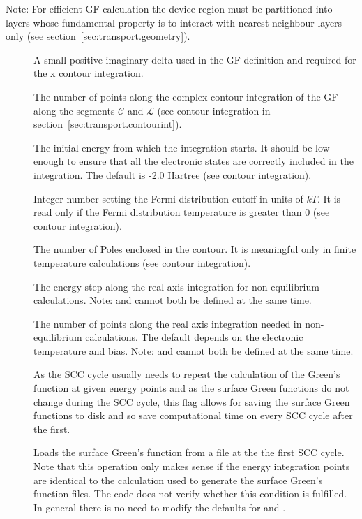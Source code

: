 Note: For efficient GF calculation the device region must be partitioned into
layers whose fundamental property is to interact with nearest-neighbour layers
only (see section~\ref{sec:transport.geometry}).

\begin{description}
\item[] A small positive imaginary delta used
  in the GF definition and required for the x contour integration.
\item[] The number of points along the complex contour
  integration of the GF along the segments $\mathcal{C}$ and $\mathcal{L}$ (see
  contour integration in section~\ref{sec:transport.contourint}).
\item[] The initial energy from which
  the integration starts. It should be low enough to ensure that all the
  electronic states are correctly included in the integration. The default is
  -2.0 Hartree (see contour integration).
\item[] Integer number setting the Fermi distribution cutoff in
  units of $kT$. It is read only if the Fermi distribution temperature is
  greater than 0 (see contour integration).
\item[] The number of Poles enclosed in the contour. It is
  meaningful only in finite temperature calculations (see contour integration).
\item[] The energy step along the real
  axis integration for non-equilibrium calculations. Note:  and
   cannot both be defined at the same time.

\item[] The number of points along the real axis integration
  needed in non-equilibrium calculations. The default depends on the electronic
  temperature and bias. Note:  and  cannot
  both be defined at the same time.

\item[] As the SCC cycle usually needs to repeat the
  calculation of the Green's function at given energy points and as the surface
  Green functions do not change during the SCC cycle, this flag allows for
  saving the surface Green functions to disk and so save computational time on
  every SCC cycle after the first.

\item[] Loads the surface Green's function from a file at the
  the first SCC cycle. Note that this operation only makes sense if the energy
  integration points are identical to the calculation used to generate the
  surface Green's function files. The code does not verify whether this
  condition is fulfilled. In general there is no need to modify the defaults for
   and .


\end{description}
